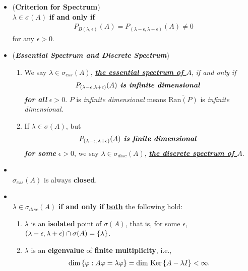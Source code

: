 \documentclass[11pt]{article}
\begin{document}
\begin{itemize}
\item \begin{proposition} (\textbf{Criterion for Spectrum}) \citep{reed1980methods}\\
$\lambda \in \sigma(A)$ \textbf{if and only if} 
\begin{align*}
P_{B(\lambda, \epsilon)}(A) = P_{(\lambda -\epsilon, \lambda + \epsilon)}(A) \neq 0
\end{align*}  for any $\epsilon > 0$. 
\end{proposition}

\item \begin{definition} (\emph{\textbf{Essential Spectrum and Discrete Spectrum}}) 
\begin{enumerate}
\item We say $\lambda \in \sigma_{ess}(A)$, \underline{\emph{\textbf{the essential spectrum of $A$}}}, \emph{if and only if} 
\begin{align*}
P_{(\lambda -\epsilon, \lambda + \epsilon)}(A) \text{\emph{\textbf{ is infinite dimensional }}}
\end{align*}
\emph{\textbf{for all}} $\epsilon > 0$. $P$ is \emph{infinite dimensional} means $\overline{\text{Ran}(P)}$ is \emph{infinite dimensional}. 
\item If $\lambda \in \sigma(A)$, but 
\begin{align*}
P_{(\lambda -\epsilon, \lambda + \epsilon)}(A) \text{\emph{\textbf{ is finite dimensional }}}
\end{align*}
\emph{\textbf{for some}} $\epsilon > 0$, we say $\lambda \in \sigma_{disc}(A)$, \underline{\emph{\textbf{the discrete spectrum of $Α$}}}.
\end{enumerate}

\end{definition}

\item \begin{proposition} \citep{reed1980methods}\\
$\sigma_{ess}(A)$ is always \textbf{closed}. 
\end{proposition}

\item \begin{proposition}  \citep{reed1980methods}\\
$\lambda \in \sigma_{disc}(A)$ \textbf{if and only if} \underline{\textbf{both}} the following hold: 
\begin{enumerate}
\item $\lambda$ is an \textbf{isolated} point of $\sigma(A)$, that is, for some $\epsilon$, $(\lambda -\epsilon, \lambda + \epsilon) \cap \sigma(A) = \left\{\lambda\right\}$. 
\item $\lambda$ is an \textbf{eigenvalue} of \textbf{finite multiplicity}, i.e., 
\begin{align*}
\text{dim}\left\{\varphi: A\varphi = \lambda \varphi\right\} =\text{dim }\text{Ker}\left\{A - \lambda I\right\} < \infty.
\end{align*} 
\end{enumerate}
\end{proposition}


\end{itemize}
\end{document}
